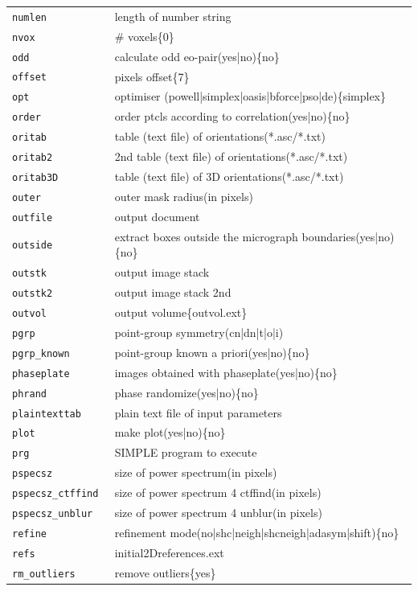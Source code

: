 \documentclass[a4paper,11pt]{article}
\begin{document}
\begin{tabular}{ll}
\texttt{numlen          }&{ length of number string}\\
\texttt{nvox            }&{ \# voxels\{0\}}\\
\texttt{odd             }&{ calculate odd eo-pair(yes|no)\{no\}}\\
\texttt{offset          }&{ pixels offset\{7\}}\\
\texttt{opt             }&{ optimiser (powell|simplex|oasis|bforce|pso|de)\{simplex\}}\\
\texttt{order           }&{ order ptcls according to correlation(yes|no)\{no\}}\\
\texttt{oritab          }&{ table (text file) of orientations(*.asc/*.txt)}\\
\texttt{oritab2         }&{ 2nd table (text file) of orientations(*.asc/*.txt)}\\
\texttt{oritab3D        }&{ table (text file) of 3D orientations(*.asc/*.txt)}\\
\texttt{outer           }&{ outer mask radius(in pixels)}\\
\texttt{outfile         }&{ output document}\\
\texttt{outside         }&{ extract boxes outside the micrograph boundaries(yes|no)\{no\}}\\
\texttt{outstk          }&{ output image stack}\\
\texttt{outstk2         }&{ output image stack 2nd}\\
\texttt{outvol          }&{ output volume\{outvol.ext\}}\\
\texttt{pgrp            }&{ point-group symmetry(cn|dn|t|o|i)}\\
\texttt{pgrp\_known      }&{ point-group known a priori(yes|no)\{no\}}\\
\texttt{phaseplate      }&{ images obtained with phaseplate(yes|no)\{no\}}\\
\texttt{phrand          }&{ phase randomize(yes|no)\{no\}}\\
\texttt{plaintexttab    }&{ plain text file of input parameters}\\
\texttt{plot            }&{ make plot(yes|no)\{no\}}\\
\texttt{prg             }&{ SIMPLE program to execute}\\
\texttt{pspecsz         }&{ size of power spectrum(in pixels)}\\
\texttt{pspecsz\_ctffind }&{ size of power spectrum 4 ctffind(in pixels)}\\
\texttt{pspecsz\_unblur  }&{ size of power spectrum 4 unblur(in pixels)}\\
\texttt{refine          }&{ refinement mode(no|shc|neigh|shcneigh|adasym|shift)\{no\}}\\
\texttt{refs            }&{ initial2Dreferences.ext}\\
\texttt{rm\_outliers     }&{ remove outliers\{yes\}}\\
\end{tabular}
\end{document}
